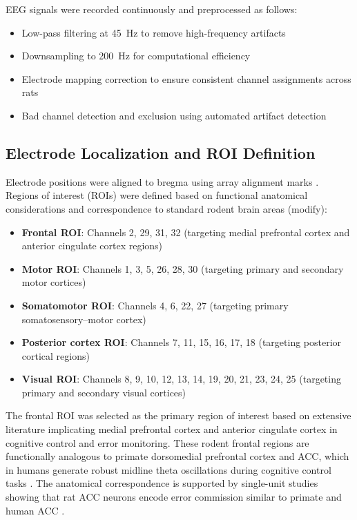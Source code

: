 \documentclass[11pt]{article}
\begin{document}
EEG signals were recorded continuously and preprocessed as follows:
\begin{itemize}
\item Low-pass filtering at 45~Hz to remove high-frequency artifacts
\item Downsampling to 200~Hz for computational efficiency
\item Electrode mapping correction to ensure consistent channel assignments across rats
\item Bad channel detection and exclusion using automated artifact detection
\end{itemize}

\subsection{Electrode Localization and ROI Definition}

Electrode positions were aligned to bregma using array alignment marks \citep{doutel2024volitional}. Regions of interest (ROIs) were defined based on functional anatomical considerations and correspondence to standard rodent brain areas (modify):

\begin{itemize}
\item \textbf{Frontal ROI}: Channels 2, 29, 31, 32 (targeting medial prefrontal cortex and anterior cingulate cortex regions)
\item \textbf{Motor ROI}: Channels 1, 3, 5, 26, 28, 30 (targeting primary and secondary motor cortices)
\item \textbf{Somatomotor ROI}: Channels 4, 6, 22, 27 (targeting primary somatosensory–motor cortex)
\item \textbf{Posterior cortex ROI}: Channels 7, 11, 15, 16, 17, 18 (targeting posterior cortical regions)
\item \textbf{Visual ROI}: Channels 8, 9, 10, 12, 13, 14, 19, 20, 21, 23, 24, 25 (targeting primary and secondary visual cortices)
\end{itemize}

The frontal ROI was selected as the primary region of interest based on extensive literature implicating medial prefrontal cortex and anterior cingulate cortex in cognitive control and error monitoring. These rodent frontal regions are functionally analogous to primate dorsomedial prefrontal cortex and ACC, which in humans generate robust midline theta oscillations during cognitive control tasks \citep{cavanagh2014frontal}. The anatomical correspondence is supported by single-unit studies showing that rat ACC neurons encode error commission similar to primate and human ACC \citep{totah2009anterior}.
\end{document}
